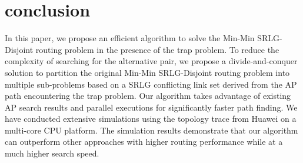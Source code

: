 \section{conclusion}
\label{sec:conclusion}
In this paper, we propose an efficient algorithm to solve the Min-Min  SRLG-Disjoint routing problem in the presence of the trap problem. To reduce the complexity of searching for the alternative pair, we propose a divide-and-conquer solution to partition the original Min-Min SRLG-Disjoint routing problem into multiple sub-problems based on a SRLG conflicting link set derived from the AP path encountering the trap problem. Our algorithm takes advantage of existing AP search results and parallel executions for significantly faster path finding.
We have conducted extensive simulations  using the topology trace from Huawei on a multi-core CPU platform. The simulation results demonstrate that our algorithm can outperform other approaches with higher routing performance while at a much higher search speed.
